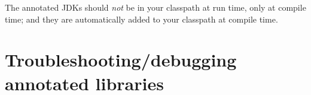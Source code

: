 The annotated JDKs should \emph{not} be in your classpath at run time, only
at compile time; and they are automatically added to your classpath at
compile time.




%
%
%
%
%
%
%


\section{Troubleshooting/debugging annotated libraries\label{libraries-troubleshooting}}


